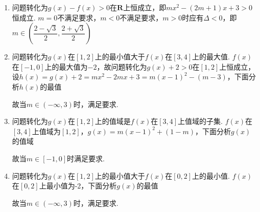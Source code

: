\begin{enumerate}
    \begin{jieda}
        \begin{enumerate}
            \item 问题转化为$g(x) - f(x) > 0$在$\mathbf{R}$上恒成立，即$mx^2-(2m+1)x+3 > 0$恒成立. $m = 0$不满足要求，$m < 0$不满足要求，$m > 0$时应有$\Delta < 0$，即$m \in \left(\dfrac{2-\sqrt{3}}{2}, \dfrac{2+\sqrt{3}}{2}\right)$
            \item 问题转化为$g(x)$在$[1, 2]$上的最小值大于$f(x)$在$[3, 4]$上的最大值. $f(x)$在$[-1, 0]$上的最大值为$-2$，故问题转化为$g(x) + 2 > 0$在$[1, 2]$上恒成立，设$h(x) = g(x) + 2 = mx^2-2mx + 3 = m(x-1)^2-(m-3)$，下面分析$h(x)$的最值
            故当$m \in (-\infty, 3)$时，满足要求.
            \item 问题转化为$g(x)$在$[1, 2]$上的值域是$f(x)$在$[3, 4]$上值域的子集. $f(x)$在$[3, 4]$上值域为$[1, 2]$，$g(x) = m(x-1)^2 + (1-m)$，下面分析$g(x)$的值域
            故当$m \in [-1, 0]$时满足要求.
            \item 问题转化为$g(x)$在$[1, 2]$上的最小值大于$f(x)$在$[0, 2]$上的最小值. $f(x)$在$[0, 2]$上最小值为-2，下面分析$g(x)$的最值
            故当$m \in (-\infty, 3)$时，满足要求.
        \end{enumerate}
    \end{jieda}


\end{enumerate}
